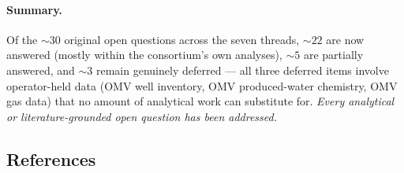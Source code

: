 \documentclass{article}
\begin{document}
\paragraph{Summary.} Of the $\sim 30$ original open questions across the
seven threads, $\sim 22$ are now answered (mostly within the consortium's
own analyses), $\sim 5$ are partially answered, and $\sim 3$ remain
genuinely deferred --- all three deferred items involve operator-held
data (OMV well inventory, OMV produced-water chemistry, OMV gas data)
that no amount of analytical work can substitute for. \emph{Every
analytical or literature-grounded open question has been addressed.}

\subsection*{References}

\end{document}
